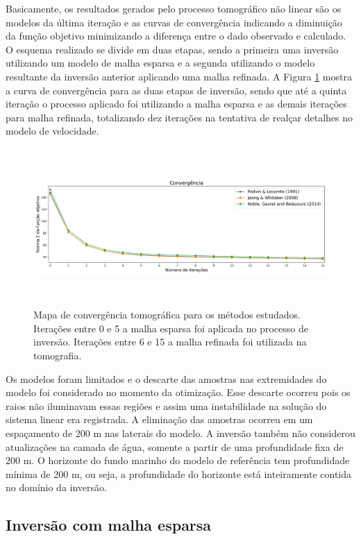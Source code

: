 Basicamente, os resultados gerados pelo processo tomográfico não linear são os modelos da última iteração e as curvas de convergência indicando a diminuição da função objetivo minimizando a diferença entre o dado observado e calculado. O esquema realizado se divide em duas etapas, sendo a primeira uma inversão utilizando um modelo de malha esparsa e a segunda utilizando o modelo resultante da inversão anterior aplicando uma malha refinada. A Figura \ref{fig:convergencia} mostra a curva de convergência para as duas etapas de inversão, sendo que até a quinta iteração o processo aplicado foi utilizando a malha esparsa e as demais iterações para malha refinada, totalizando dez iterações na tentativa de realçar detalhes no modelo de velocidade.   

\begin{figure}[H]
	\centering
	\includegraphics[width=16cm,height=6cm]{Imgs/Resultados/convergencia.png}
	\caption{Mapa de convergência tomográfica para os métodos estudados. Iterações entre 0 e 5 a malha esparsa foi aplicada no processo de inversão. Iterações entre 6 e 15 a malha refinada foi utilizada na tomografia.}
	\label{fig:convergencia}	
\end{figure}

Os modelos foram limitados e o descarte das amostras nas extremidades do modelo foi considerado no momento da otimização. Esse descarte ocorreu pois os raios não iluminavam essas regiões e assim uma instabilidade na solução do sistema linear era registrada. A eliminação das amostras ocorreu em um espaçamento de 200 m nas laterais do modelo. A inversão também não considerou atualizações na camada de água, somente a partir de uma profundidade fixa de 200 m. O horizonte do fundo marinho do modelo de referência tem profundidade mínima de 200 m, ou seja, a profundidade do horizonte está inteiramente contida no domínio da inversão.     

\subsection{Inversão com malha esparsa}

